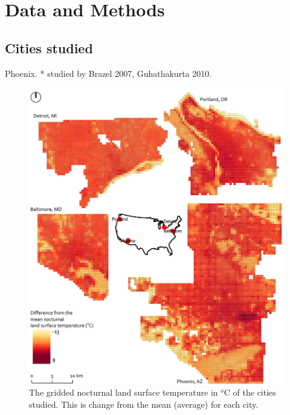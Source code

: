 \documentclass[]{elsarticle}
\begin{document}
\section{Data and Methods}
\subsection{Cities studied}

Phoenix.
* studied by Brazel 2007, Guhathakurta 2010.

\begin{figure}[H]
    \centering
    \includegraphics[width=\linewidth]{fig/report/map_nocturnal_lst.pdf}
    \caption{The gridded nocturnal land surface temperature in $^o$C of the cities studied. This is change from the mean (average) for each city.}
    \label{fig:map}
\end{figure}
\end{document}
